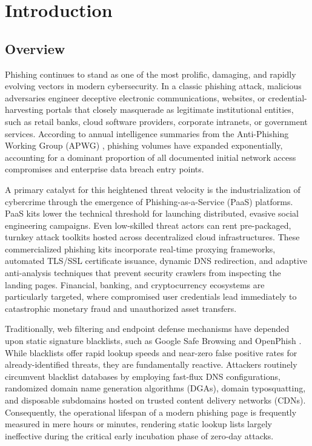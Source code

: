 \chapter{Introduction}

\section{Overview}
Phishing continues to stand as one of the most prolific, damaging, and rapidly evolving vectors in modern cybersecurity. In a classic phishing attack, malicious adversaries engineer deceptive electronic communications, websites, or credential-harvesting portals that closely masquerade as legitimate institutional entities, such as retail banks, cloud software providers, corporate intranets, or government services. According to annual intelligence summaries from the Anti-Phishing Working Group (APWG) \cite{13}, phishing volumes have expanded exponentially, accounting for a dominant proportion of all documented initial network access compromises and enterprise data breach entry points.

A primary catalyst for this heightened threat velocity is the industrialization of cybercrime through the emergence of Phishing-as-a-Service (PaaS) platforms. PaaS kits lower the technical threshold for launching distributed, evasive social engineering campaigns. Even low-skilled threat actors can rent pre-packaged, turnkey attack toolkits hosted across decentralized cloud infrastructures. These commercialized phishing kits incorporate real-time proxying frameworks, automated TLS/SSL certificate issuance, dynamic DNS redirection, and adaptive anti-analysis techniques that prevent security crawlers from inspecting the landing pages. Financial, banking, and cryptocurrency ecosystems are particularly targeted, where compromised user credentials lead immediately to catastrophic monetary fraud and unauthorized asset transfers.

Traditionally, web filtering and endpoint defense mechanisms have depended upon static signature blacklists, such as Google Safe Browsing and OpenPhish \cite{1}. While blacklists offer rapid lookup speeds and near-zero false positive rates for already-identified threats, they are fundamentally reactive. Attackers routinely circumvent blacklist databases by employing fast-flux DNS configurations, randomized domain name generation algorithms (DGAs), domain typosquatting, and disposable subdomains hosted on trusted content delivery networks (CDNs). Consequently, the operational lifespan of a modern phishing page is frequently measured in mere hours or minutes, rendering static lookup lists largely ineffective during the critical early incubation phase of zero-day attacks.

